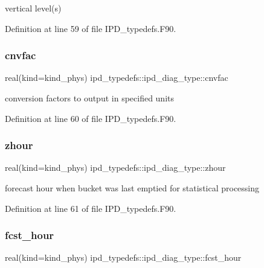 vertical level(s) 



Definition at line 59 of file I\+P\+D\+\_\+typedefs.\+F90.

\mbox{\label{structipd__typedefs_1_1ipd__diag__type_a29b55cd7963815b209401bece81a5f8f}} 
\subsubsection{cnvfac}
{\footnotesize\ttfamily real(kind=kind\+\_\+phys) ipd\+\_\+typedefs\+::ipd\+\_\+diag\+\_\+type\+::cnvfac}



conversion factors to output in specified units 



Definition at line 60 of file I\+P\+D\+\_\+typedefs.\+F90.

\mbox{\label{structipd__typedefs_1_1ipd__diag__type_a47474ea3b178fcda4d69fc3ef8b1ba82}} 
\subsubsection{zhour}
{\footnotesize\ttfamily real(kind=kind\+\_\+phys) ipd\+\_\+typedefs\+::ipd\+\_\+diag\+\_\+type\+::zhour}



forecast hour when bucket was last emptied for statistical processing 



Definition at line 61 of file I\+P\+D\+\_\+typedefs.\+F90.

\mbox{\label{structipd__typedefs_1_1ipd__diag__type_a8de1d39195951ac26ccec6657970d5bb}} 
\subsubsection{fcst\+\_\+hour}
{\footnotesize\ttfamily real(kind=kind\+\_\+phys) ipd\+\_\+typedefs\+::ipd\+\_\+diag\+\_\+type\+::fcst\+\_\+hour}




